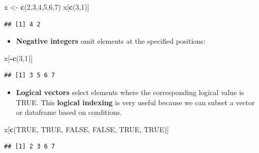 \documentclass[]{book}
\newenvironment{Shaded}{\begin{snugshade}}{\end{snugshade}}
\newcommand{\DecValTok}[1]{\textcolor[rgb]{0.00,0.00,0.81}{#1}}
\newcommand{\KeywordTok}[1]{\textcolor[rgb]{0.13,0.29,0.53}{\textbf{#1}}}
\newcommand{\NormalTok}[1]{#1}
\newcommand{\OperatorTok}[1]{\textcolor[rgb]{0.81,0.36,0.00}{\textbf{#1}}}
\newcommand{\OtherTok}[1]{\textcolor[rgb]{0.56,0.35,0.01}{#1}}
\newcommand{\StringTok}[1]{\textcolor[rgb]{0.31,0.60,0.02}{#1}}
\providecommand{\tightlist}{%
  \setlength{\itemsep}{0pt}\setlength{\parskip}{0pt}}
\begin{document}
\begin{Shaded}
\begin{Highlighting}[]
\NormalTok{x <-}\StringTok{ }\KeywordTok{c}\NormalTok{(}\DecValTok{2}\NormalTok{,}\DecValTok{3}\NormalTok{,}\DecValTok{4}\NormalTok{,}\DecValTok{5}\NormalTok{,}\DecValTok{6}\NormalTok{,}\DecValTok{7}\NormalTok{)}
\NormalTok{x[}\KeywordTok{c}\NormalTok{(}\DecValTok{3}\NormalTok{,}\DecValTok{1}\NormalTok{)]}
\end{Highlighting}
\end{Shaded}

\begin{verbatim}
## [1] 4 2
\end{verbatim}

\begin{itemize}
\tightlist
\item
  \textbf{Negative integers} omit elements at the specified positions:
\end{itemize}

\begin{Shaded}
\begin{Highlighting}[]
\NormalTok{x[}\OperatorTok{-}\KeywordTok{c}\NormalTok{(}\DecValTok{3}\NormalTok{,}\DecValTok{1}\NormalTok{)]}
\end{Highlighting}
\end{Shaded}

\begin{verbatim}
## [1] 3 5 6 7
\end{verbatim}

\begin{itemize}
\tightlist
\item
  \textbf{Logical vectors} select elements where the corresponding logical value is TRUE. This \textbf{logical indexing} is very useful because we can subset a vector or dataframe based on conditions.
\end{itemize}

\begin{Shaded}
\begin{Highlighting}[]
\NormalTok{x[}\KeywordTok{c}\NormalTok{(}\OtherTok{TRUE}\NormalTok{, }\OtherTok{TRUE}\NormalTok{, }\OtherTok{FALSE}\NormalTok{, }\OtherTok{FALSE}\NormalTok{, }\OtherTok{TRUE}\NormalTok{, }\OtherTok{TRUE}\NormalTok{)]}
\end{Highlighting}
\end{Shaded}

\begin{verbatim}
## [1] 2 3 6 7
\end{verbatim}
\end{document}
